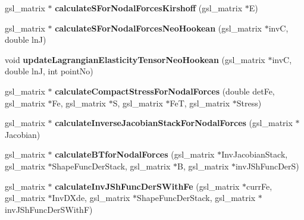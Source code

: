 \begin{DoxyCompactItemize}
\item 
\hypertarget{classShapeBase_a9c79b3bced80eac8af18a0a81d3898ab}{}gsl\+\_\+matrix $\ast$ {\bfseries calculate\+S\+For\+Nodal\+Forces\+Kirshoff} (gsl\+\_\+matrix $\ast$E)\label{classShapeBase_a9c79b3bced80eac8af18a0a81d3898ab}

\item 
\hypertarget{classShapeBase_a697f24754441df216b4245e7eb467b13}{}gsl\+\_\+matrix $\ast$ {\bfseries calculate\+S\+For\+Nodal\+Forces\+Neo\+Hookean} (gsl\+\_\+matrix $\ast$inv\+C, double ln\+J)\label{classShapeBase_a697f24754441df216b4245e7eb467b13}

\item 
\hypertarget{classShapeBase_a606ddc7f909062e9faae9f4a311ccd8a}{}void {\bfseries update\+Lagrangian\+Elasticity\+Tensor\+Neo\+Hookean} (gsl\+\_\+matrix $\ast$inv\+C, double ln\+J, int point\+No)\label{classShapeBase_a606ddc7f909062e9faae9f4a311ccd8a}

\item 
\hypertarget{classShapeBase_a54d16f9a6cff5031555c0cbf3892873a}{}gsl\+\_\+matrix $\ast$ {\bfseries calculate\+Compact\+Stress\+For\+Nodal\+Forces} (double det\+Fe, gsl\+\_\+matrix $\ast$Fe, gsl\+\_\+matrix $\ast$S, gsl\+\_\+matrix $\ast$Fe\+T, gsl\+\_\+matrix $\ast$Stress)\label{classShapeBase_a54d16f9a6cff5031555c0cbf3892873a}

\item 
\hypertarget{classShapeBase_ac9eaa594e8955de91b2f4b0368c85bae}{}gsl\+\_\+matrix $\ast$ {\bfseries calculate\+Inverse\+Jacobian\+Stack\+For\+Nodal\+Forces} (gsl\+\_\+matrix $\ast$Jacobian)\label{classShapeBase_ac9eaa594e8955de91b2f4b0368c85bae}

\item 
\hypertarget{classShapeBase_ad67919694a1d780e31f6d539781377be}{}gsl\+\_\+matrix $\ast$ {\bfseries calculate\+B\+Tfor\+Nodal\+Forces} (gsl\+\_\+matrix $\ast$Inv\+Jacobian\+Stack, gsl\+\_\+matrix $\ast$Shape\+Func\+Der\+Stack, gsl\+\_\+matrix $\ast$B, gsl\+\_\+matrix $\ast$inv\+J\+Sh\+Func\+Der\+S)\label{classShapeBase_ad67919694a1d780e31f6d539781377be}

\item 
\hypertarget{classShapeBase_aa9f48481aba22e06b07e6ce665ef58fb}{}gsl\+\_\+matrix $\ast$ {\bfseries calculate\+Inv\+J\+Sh\+Func\+Der\+S\+With\+Fe} (gsl\+\_\+matrix $\ast$curr\+Fe, gsl\+\_\+matrix $\ast$Inv\+D\+Xde, gsl\+\_\+matrix $\ast$Shape\+Func\+Der\+Stack, gsl\+\_\+matrix $\ast$inv\+J\+Sh\+Func\+Der\+S\+With\+F)\label{classShapeBase_aa9f48481aba22e06b07e6ce665ef58fb}


\end{DoxyCompactItemize}
